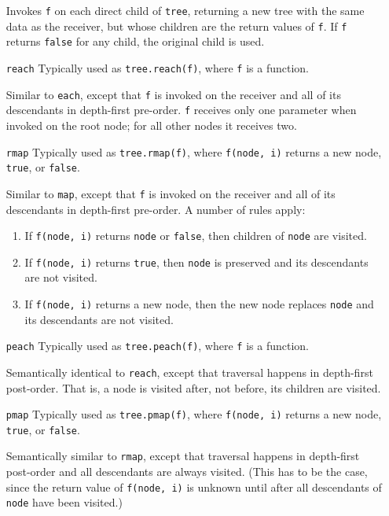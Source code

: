 \documentclass{report}
\begin{document}
\begin{enumerate}
  Invokes {\tt f} on each direct child of {\tt tree}, returning a new tree with the same data as the receiver, but whose children are the return values of {\tt f}. If {\tt f} returns
  {\tt false} for any child, the original child is used.

\item[{\tt reach}]
  Typically used as {\tt tree.reach(f)}, where {\tt f} is a function.

  Similar to {\tt each}, except that {\tt f} is invoked on the receiver and all of its descendants in depth-first pre-order. {\tt f} receives only one parameter when invoked on the root
  node; for all other nodes it receives two.

\item[{\tt rmap}]
  Typically used as {\tt tree.rmap(f)}, where {\tt f(node, i)} returns a new node, {\tt true}, or {\tt false}.

  Similar to {\tt map}, except that {\tt f} is invoked on the receiver and all of its descendants in depth-first pre-order. A number of rules apply:

\begin{enumerate}
\item{If {\tt f(node, i)} returns {\tt node} or {\tt false}, then children of {\tt node} are visited.}
\item{If {\tt f(node, i)} returns {\tt true}, then {\tt node} is preserved and its descendants are not visited.}
\item{If {\tt f(node, i)} returns a new node, then the new node replaces {\tt node} and its descendants are not visited.}
\end{enumerate}

\item[{\tt peach}]
  Typically used as {\tt tree.peach(f)}, where {\tt f} is a function.

  Semantically identical to {\tt reach}, except that traversal happens in depth-first post-order. That is, a node is visited after, not before, its children are visited.

\item[{\tt pmap}]
  Typically used as {\tt tree.pmap(f)}, where {\tt f(node, i)} returns a new node, {\tt true}, or {\tt false}.

  Semantically similar to {\tt rmap}, except that traversal happens in depth-first post-order and all descendants are always visited. (This has to be the case, since the return value of
  {\tt f(node, i)} is unknown until after all descendants of {\tt node} have been visited.)


\end{enumerate}
\end{document}
